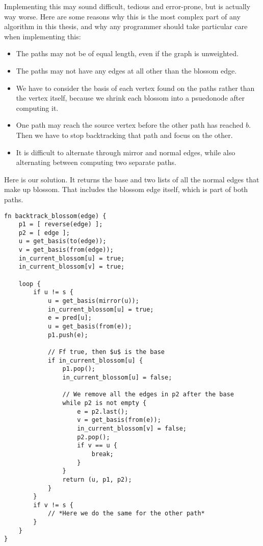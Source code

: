Implementing this may sound difficult, tedious and error-prone, but is actually way worse. Here are some reasons why this is the most complex part of any algorithm in this thesis, and why any programmer should take particular care when implementing this:
\begin{itemize}
    \item The paths may not be of equal length, even if the graph is unweighted.
    \item The paths may not have any edges at all other than the blossom edge.
    \item We have to consider the basis of each vertex found on the paths rather than the vertex itself, because we shrink each blossom into a psuedonode after computing it.
    \item One path may reach the source vertex before the other path has reached $b$. Then we have to stop backtracking that path and focus on the other.
    \item It is difficult to alternate through mirror and normal edges, while also alternating between computing two separate paths.
\end{itemize}

Here is our solution. It returns the base and two lists of all the normal edges that make up blossom. That includes the blossom edge itself, which is part of both paths.
\begin{lstlisting}[caption={Backtrack blossom},label=Listing,mathescape=true]
fn backtrack_blossom(edge) {
    p1 = [ reverse(edge) ];
    p2 = [ edge ];
    u = get_basis(to(edge));
    v = get_basis(from(edge));
    in_current_blossom[u] = true;
    in_current_blossom[v] = true;

    loop {
        if u != s {
            u = get_basis(mirror(u));
            in_current_blossom[u] = true;
            e = pred[u];
            u = get_basis(from(e));
            p1.push(e);

            // Ff true, then $u$ is the base
            if in_current_blossom[u] { 
                p1.pop();
                in_current_blossom[u] = false;

                // We remove all the edges in p2 after the base
                while p2 is not empty {
                    e = p2.last();
                    v = get_basis(from(e));
                    in_current_blossom[v] = false;
                    p2.pop();
                    if v == u {
                        break;
                    }
                }
                return (u, p1, p2);
            }
        }
        if v != s {
            // *Here we do the same for the other path*
        }
    }
}
\end{lstlisting}


